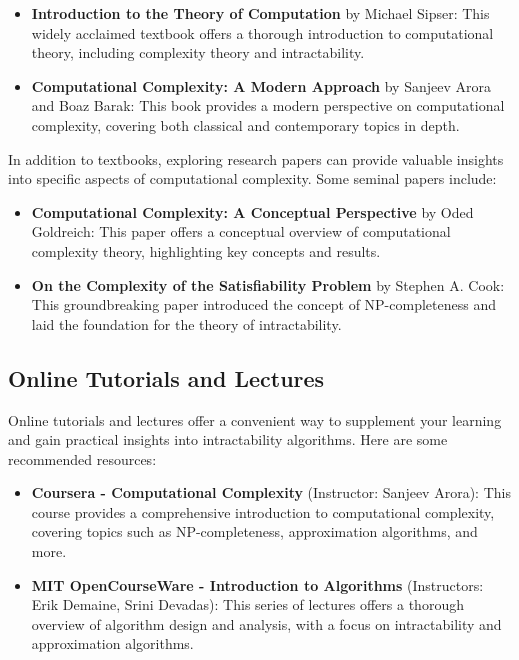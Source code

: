 \documentclass[12pt]{book} %
\begin{document}
\begin{itemize}
    \item \textbf{Introduction to the Theory of Computation} by Michael Sipser: This widely acclaimed textbook offers a thorough introduction to computational theory, including complexity theory and intractability.
    \item \textbf{Computational Complexity: A Modern Approach} by Sanjeev Arora and Boaz Barak: This book provides a modern perspective on computational complexity, covering both classical and contemporary topics in depth.
\end{itemize}

In addition to textbooks, exploring research papers can provide valuable insights into specific aspects of computational complexity. Some seminal papers include:

\begin{itemize}
    \item \textbf{Computational Complexity: A Conceptual Perspective} by Oded Goldreich: This paper offers a conceptual overview of computational complexity theory, highlighting key concepts and results.
    \item \textbf{On the Complexity of the Satisfiability Problem} by Stephen A. Cook: This groundbreaking paper introduced the concept of NP-completeness and laid the foundation for the theory of intractability.
\end{itemize}

\subsection{Online Tutorials and Lectures}
Online tutorials and lectures offer a convenient way to supplement your learning and gain practical insights into intractability algorithms. Here are some recommended resources:

\begin{itemize}
    \item \textbf{Coursera - Computational Complexity} (Instructor: Sanjeev Arora): This course provides a comprehensive introduction to computational complexity, covering topics such as NP-completeness, approximation algorithms, and more.
    \item \textbf{MIT OpenCourseWare - Introduction to Algorithms} (Instructors: Erik Demaine, Srini Devadas): This series of lectures offers a thorough overview of algorithm design and analysis, with a focus on intractability and approximation algorithms.
\end{itemize}
\end{document}
